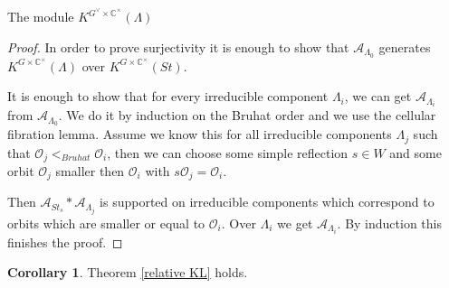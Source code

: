 \documentclass[12pt]{article}
\newcommand{\A}{\mathcal{A}}
\newcommand{\C}{\mathbb{C}}
\newcommand{\s}{\mathcal{O}}
\newcommand{\<}{\langle}
\renewcommand{\>}{\rangle}
\theoremstyle{plain}
\theoremstyle{definition}
\newtheorem{cor}[theorem]{Corollary}
\begin{document}
\begin{section}{The module $K^{G^\vee\times \C^\times}(\Lambda)$}
\begin{proof}
    In order to prove surjectivity it is enough to show that $\A_{\Lambda_0}$ generates $K^{G\times \C^\times}(\Lambda)$ over $K^{G\times \C^\times}(St)$.

    It is enough to show that for every irreducible component $\Lambda_i$, we can get $\A_{\Lambda_i}$ from $\A_{\Lambda_0}$. We do it by induction on the Bruhat order and we use the cellular fibration lemma. Assume we know this for all irreducible components $\Lambda_j$ such that $\s_j<_{Bruhat}\s_i$, then we can choose some simple reflection $s\in W$ and some orbit $\s_j$ smaller then $\s_i$ with $s\s_j=\s_i$. 
    
    Then $\A_{St_s}*\A_{\Lambda_j}$ is supported on irreducible components which correspond to orbits which are smaller or equal to $\s_i$. Over $\Lambda_i$ we get $\A_{\Lambda_i}$. By induction this finishes the proof.
\end{proof}

\begin{cor}
    Theorem \ref{relative KL} holds.
\end{cor}
\end{section}
\end{document}
